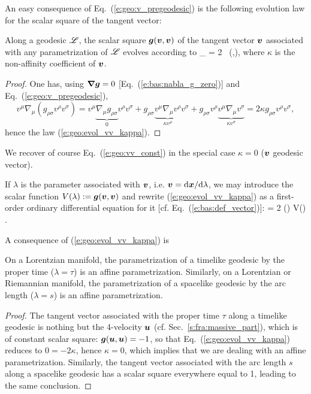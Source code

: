 An easy consequence of Eq.~(\ref{e:geo:v_pregeodesic}) is the following
evolution law for the scalar square of the tangent vector:
\begin{prop}
Along a geodesic $\mathscr{L}$, the scalar square $\bm{g}(\bm{v},\bm{v})$
of the tangent vector $\bm{v}$ associated with any parametrization of $\mathscr{L}$
evolves according to
\be \label{e:geo:evol_vv_kappa}
    \wnab_{\!} \left[ \w{g}(\w{v},\w{v}) \right] = 2 \kappa \, (,),
\ee
where $\kappa$ is the non-affinity coefficient of $\bm{v}$.
\end{prop}
\begin{proof}
One has, using $\bm{\nabla}\bm{g}=0$ [Eq.~(\ref{e:bas:nabla_g_zero})] and Eq.~(\ref{e:geo:v_pregeodesic}),
\[
    v^\mu \nabla_\mu (g_{\rho\sigma} v^\rho v^\sigma)  = v^\mu \underbrace{\nabla_\mu g_{\rho\sigma}}_{0} v^\rho v^\sigma
                + g_{\rho\sigma} \underbrace{v^\mu \nabla_\mu v^\rho}_{\kappa v^\rho} v^\sigma
                + g_{\rho\sigma} v^\rho \underbrace{v^\mu \nabla_\mu v^\sigma}_{\kappa v^\sigma}
             = 2 \kappa  g_{\rho\sigma} v^\rho v^\sigma  ,
\]
hence the law (\ref{e:geo:evol_vv_kappa}).
\end{proof}
We recover of course Eq.~(\ref{e:geo:vv_const}) in the special case $\kappa = 0$
($\bm{v}$ geodesic vector).
\begin{remark}
If $\lambda$ is the parameter associated with $\bm{v}$, i.e. $\bm{v} = \mathrm{d}\bm{x}/\mathrm{d}\lambda$,
we may introduce the scalar function $V(\lambda) := \bm{g}(\bm{v},\bm{v})$ and
rewrite (\ref{e:geo:evol_vv_kappa}) as a first-order ordinary differential equation
for it [cf. Eq.~(\ref{e:bas:def_vector})]:
\be
     = 2 \kappa(\lambda) V(\lambda) .
\ee
\end{remark}
A consequence of (\ref{e:geo:evol_vv_kappa}) is
\begin{prop}
\label{p:geo:proper_time_affine}
On a Lorentzian manifold, the parametrization of a timelike geodesic
by the proper time ($\lambda = \tau$) is an affine parametrization.
Similarly, on a Lorentzian or Riemannian manifold, the parametrization of a
spacelike geodesic
by the arc length ($\lambda = s$) is an affine parametrization.
\end{prop}
\begin{proof}
The tangent vector associated with the proper time $\tau$ along a timelike geodesic
is nothing but the 4-velocity $\bm{u}$ (cf. Sec.~\ref{s:fra:massive_part}), which
is of constant scalar square: $\bm{g}(\bm{u},\bm{u}) = -1$, so that Eq.~(\ref{e:geo:evol_vv_kappa})
reduces to $0 = -2 \kappa$, hence $\kappa=0$, which implies that we are dealing
with an affine parametrization. Similarly, the tangent vector associated with the
arc length $s$ along a spacelike geodesic has a scalar square everywhere equal
to 1, leading to the same conclusion.
\end{proof}

